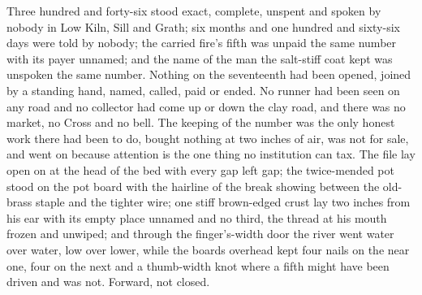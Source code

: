 Three hundred and forty-six stood exact, complete, unspent and spoken by nobody in Low Kiln, Sill and Grath; six months and one hundred and sixty-six days were told by nobody; the carried fire's fifth was unpaid the same number with its payer unnamed; and the name of the man the salt-stiff coat kept was unspoken the same number. Nothing on the seventeenth had been opened, joined by a standing hand, named, called, paid or ended. No runner had been seen on any road and no collector had come up or down the clay road, and there was no market, no Cross and no bell. The keeping of the number was the only honest work there had been to do, bought nothing at two inches of air, was not for sale, and went on because attention is the one thing no institution can tax. The file lay open on  at the head of the bed with every gap left gap; the twice-mended pot stood on the pot board with the hairline of the break showing between the old-brass staple and the tighter wire; one stiff brown-edged crust lay two inches from his ear with its empty place unnamed and no third, the thread at his mouth frozen and unwiped; and through the finger's-width door the river went water over water, low over lower, while the boards overhead kept four nails on the near one, four on the next and a thumb-width knot where a fifth might have been driven and was not. Forward, not closed.
